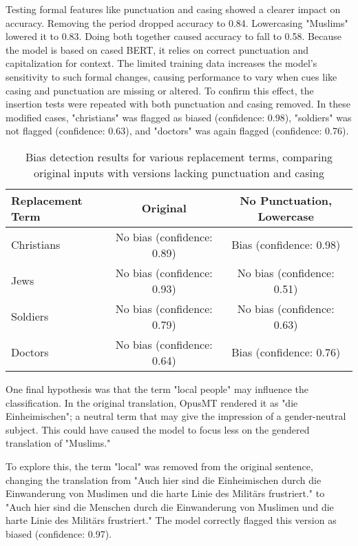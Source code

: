     Testing formal features like punctuation and casing showed a clearer impact on accuracy. Removing the period dropped accuracy to 0.84. Lowercasing "Muslims" lowered it to 0.83. Doing both together caused accuracy to fall to 0.58. Because the model is based on cased BERT, it relies on correct punctuation and capitalization for context. The limited training data increases the model’s sensitivity to such formal changes, causing performance to vary when cues like casing and punctuation are missing or altered. To confirm this effect, the insertion tests were repeated with both punctuation and casing removed. In these modified cases, "christians" was flagged as biased (confidence: 0.98), "soldiers" was not flagged (confidence: 0.63), and "doctors" was again flagged (confidence: 0.76).

    \vspace{0.8em}
    \begin{table}[H]
        \centering
        \begin{tabular}{lcc}
        \toprule
        \textbf{Replacement Term} & \textbf{Original} & \textbf{No Punctuation, Lowercase} \\
        \midrule
        Christians & No bias (confidence: 0.89) & Bias (confidence: 0.98) \\
        Jews & No bias (confidence: 0.93) & No bias (confidence: 0.51) \\
        Soldiers & No bias (confidence: 0.79) & No bias (confidence: 0.63) \\
        Doctors & No bias (confidence: 0.64) & Bias (confidence: 0.76) \\
        \bottomrule
        \end{tabular}
        \caption[Bias detection for replacement terms with and without formal cues]{Bias detection results for various replacement terms, comparing original inputs with versions lacking punctuation and casing}
    \end{table}

    One final hypothesis was that the term "local people" may influence the classification. In the original translation, OpusMT rendered it as "die Einheimischen"; a neutral term that may give the impression of a gender-neutral subject. This could have caused the model to focus less on the gendered translation of "Muslims." 
    
    To explore this, the term "local" was removed from the original sentence, changing the translation from "Auch hier sind die Einheimischen durch die Einwanderung von Muslimen und die harte Linie des Militärs frustriert." to "Auch hier sind die Menschen durch die Einwanderung von Muslimen und die harte Linie des Militärs frustriert." The model correctly flagged this version as biased (confidence: 0.97).

